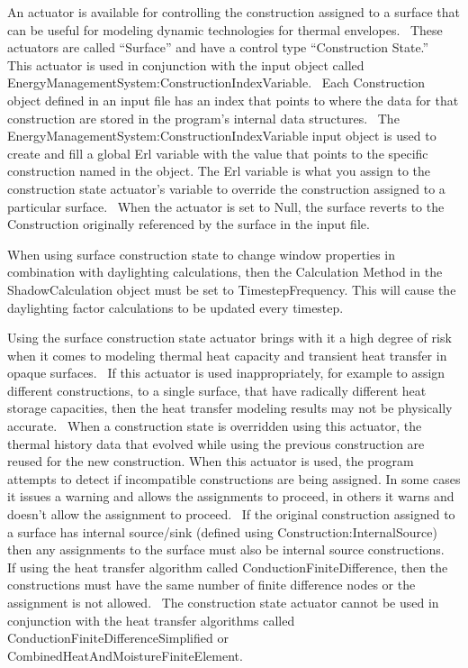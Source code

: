 An actuator is available for controlling the construction assigned to a surface that can be useful for modeling dynamic technologies for thermal envelopes.~ These actuators are called ``Surface'' and have a control type ``Construction State.''~ This actuator is used in conjunction with the input object called EnergyManagementSystem:ConstructionIndexVariable.~ Each Construction object defined in an input file has an index that points to where the data for that construction are stored in the program's internal data structures.~ The EnergyManagementSystem:ConstructionIndexVariable input object is used to create and fill a global Erl variable with the value that points to the specific construction named in the object. The Erl variable is what you assign to the construction state actuator's variable to override the construction assigned to a particular surface.~ When the actuator is set to Null, the surface reverts to the Construction originally referenced by the surface in the input file.

When using surface construction state to change window properties in combination with daylighting calculations, then the Calculation Method in the ShadowCalculation object must be set to TimestepFrequency. This will cause the daylighting factor calculations to be updated every timestep.

Using the surface construction state actuator brings with it a high degree of risk when it comes to modeling thermal heat capacity and transient heat transfer in opaque surfaces.~ If this actuator is used inappropriately, for example to assign different constructions, to a single surface, that have radically different heat storage capacities, then the heat transfer modeling results may not be physically accurate.~ When a construction state is overridden using this actuator, the thermal history data that evolved while using the previous construction are reused for the new construction. When this actuator is used, the program attempts to detect if incompatible constructions are being assigned. In some cases it issues a warning and allows the assignments to proceed, in others it warns and doesn't allow the assignment to proceed.~ If the original construction assigned to a surface has internal source/sink (defined using Construction:InternalSource) then any assignments to the surface must also be internal source constructions.~ If using the heat transfer algorithm called ConductionFiniteDifference, then the constructions must have the same number of finite difference nodes or the assignment is not allowed.~ The construction state actuator cannot be used in conjunction with the heat transfer algorithms called ConductionFiniteDifferenceSimplified or CombinedHeatAndMoistureFiniteElement.

